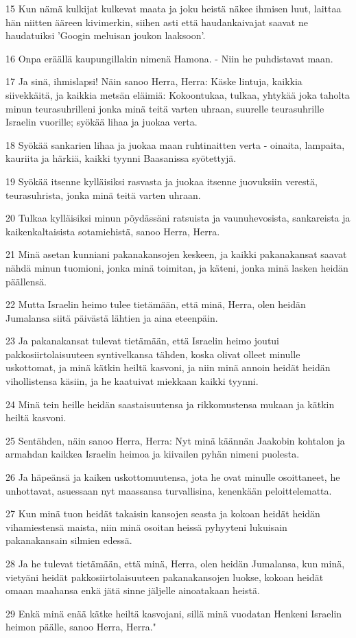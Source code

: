 \par 15 Kun nämä kulkijat kulkevat maata ja joku heistä näkee ihmisen luut, laittaa hän niitten ääreen kivimerkin, siihen asti että haudankaivajat saavat ne haudatuiksi 'Googin meluisan joukon laaksoon'.
\par 16 Onpa eräällä kaupungillakin nimenä Hamona. - Niin he puhdistavat maan.
\par 17 Ja sinä, ihmislapsi! Näin sanoo Herra, Herra: Käske lintuja, kaikkia siivekkäitä, ja kaikkia metsän eläimiä: Kokoontukaa, tulkaa, yhtykää joka taholta minun teurasuhrilleni jonka minä teitä varten uhraan, suurelle teurasuhrille Israelin vuorille; syökää lihaa ja juokaa verta.
\par 18 Syökää sankarien lihaa ja juokaa maan ruhtinaitten verta - oinaita, lampaita, kauriita ja härkiä, kaikki tyynni Baasanissa syötettyjä.
\par 19 Syökää itsenne kylläisiksi rasvasta ja juokaa itsenne juovuksiin verestä, teurasuhrista, jonka minä teitä varten uhraan.
\par 20 Tulkaa kylläisiksi minun pöydässäni ratsuista ja vaunuhevosista, sankareista ja kaikenkaltaisista sotamiehistä, sanoo Herra, Herra.
\par 21 Minä asetan kunniani pakanakansojen keskeen, ja kaikki pakanakansat saavat nähdä minun tuomioni, jonka minä toimitan, ja käteni, jonka minä lasken heidän päällensä.
\par 22 Mutta Israelin heimo tulee tietämään, että minä, Herra, olen heidän Jumalansa siitä päivästä lähtien ja aina eteenpäin.
\par 23 Ja pakanakansat tulevat tietämään, että Israelin heimo joutui pakkosiirtolaisuuteen syntivelkansa tähden, koska olivat olleet minulle uskottomat, ja minä kätkin heiltä kasvoni, ja niin minä annoin heidät heidän vihollistensa käsiin, ja he kaatuivat miekkaan kaikki tyynni.
\par 24 Minä tein heille heidän saastaisuutensa ja rikkomustensa mukaan ja kätkin heiltä kasvoni.
\par 25 Sentähden, näin sanoo Herra, Herra: Nyt minä käännän Jaakobin kohtalon ja armahdan kaikkea Israelin heimoa ja kiivailen pyhän nimeni puolesta.
\par 26 Ja häpeänsä ja kaiken uskottomuutensa, jota he ovat minulle osoittaneet, he unhottavat, asuessaan nyt maassansa turvallisina, kenenkään peloittelematta.
\par 27 Kun minä tuon heidät takaisin kansojen seasta ja kokoan heidät heidän vihamiestensä maista, niin minä osoitan heissä pyhyyteni lukuisain pakanakansain silmien edessä.
\par 28 Ja he tulevat tietämään, että minä, Herra, olen heidän Jumalansa, kun minä, vietyäni heidät pakkosiirtolaisuuteen pakanakansojen luokse, kokoan heidät omaan maahansa enkä jätä sinne jäljelle ainoatakaan heistä.
\par 29 Enkä minä enää kätke heiltä kasvojani, sillä minä vuodatan Henkeni Israelin heimon päälle, sanoo Herra, Herra."

